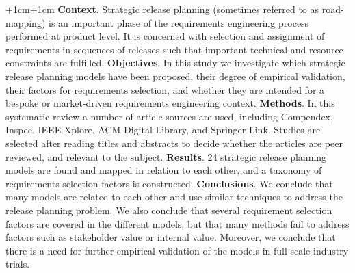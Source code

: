 \documentclass[a4paper,oneside]{bth}
\begin{document}
\abstract
\begin{changemargin}{+1cm}{+1cm}
\noindent
\textbf{Context}. Strategic release planning (sometimes referred to as
road-mapping) is an important phase of the requirements engineering process
performed at product level. It is concerned with selection and assignment of
requirements in sequences of releases such that important technical and resource
constraints are fulfilled.\newline
\textbf{Objectives}. In this study we investigate which strategic release
planning models have been proposed, their degree of empirical validation, their
factors for requirements selection, and whether they are intended for a bespoke
or market-driven requirements engineering context.\newline
\textbf{Methods}. In this systematic review a number of article sources are used,
including Compendex, Inspec, IEEE Xplore, ACM Digital Library, and Springer Link.
Studies are selected after reading titles and abstracts to decide whether the
articles are peer reviewed, and relevant to the subject.\newline
\textbf{Results}. 24 strategic release planning models are found and mapped in
relation to each other, and a taxonomy of requirements selection factors is
constructed.\newline
\textbf{Conclusions}. We conclude that many models are related to each other and
use similar techniques to address the release planning problem. We also conclude
that several requirement selection factors are covered in the different models,
but that many methods fail to address factors such as stakeholder value or
internal value. Moreover, we conclude that there is a need for further empirical
validation of the models in full scale industry trials.



\end{changemargin}
\end{document}
